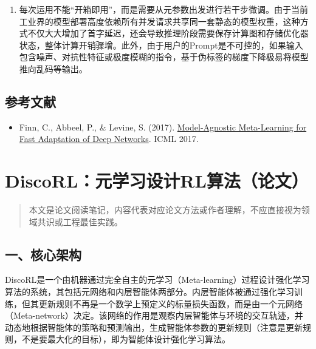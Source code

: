 \begin{enumerate}
\def\labelenumi{\arabic{enumi}.}
\setcounter{enumi}{1}
\tightlist
\item
  每次运用不能``开箱即用''，而是需要从元参数出发进行若干步微调。由于当前工业界的模型部署高度依赖所有并发请求共享同一套静态的模型权重，这种方式不仅大大增加了首字延迟，还会导致推理阶段需要保存计算图和存储优化器状态，整体计算开销骤增。此外，由于用户的Prompt是不可控的，如果输入包含噪声、对抗性特征或极度模糊的指令，基于伪标签的梯度下降极易将模型推向乱码等输出。
\end{enumerate}

\hypertarget{ux53c2ux8003ux6587ux732e-143}{%
\subsection{参考文献}\label{ux53c2ux8003ux6587ux732e-143}}

\begin{itemize}
\tightlist
\item
  Finn, C., Abbeel, P., \& Levine, S. (2017). \href{https://arxiv.org/abs/1703.03400}{Model-Agnostic Meta-Learning for Fast Adaptation of Deep Networks}. ICML 2017.
\end{itemize}

\clearpage

\hypertarget{discorlux5143ux5b66ux4e60ux8bbeux8ba1rlux7b97ux6cd5ux8bbaux6587}{%
\section{DiscoRL：元学习设计RL算法（论文）}\label{discorlux5143ux5b66ux4e60ux8bbeux8ba1rlux7b97ux6cd5ux8bbaux6587}}

\begin{quote}
本文是论文阅读笔记，内容代表对应论文方法或作者理解，不应直接视为领域共识或工程最佳实践。
\end{quote}

\hypertarget{ux4e00ux6838ux5fc3ux67b6ux6784-6}{%
\subsection{一、核心架构}\label{ux4e00ux6838ux5fc3ux67b6ux6784-6}}

DiscoRL是一个由机器通过完全自主的元学习（Meta-learning）过程设计强化学习算法的系统，其包括元网络和内层智能体两部分。内层智能体被通过强化学习训练，但其更新规则不再是一个数学上预定义的标量损失函数，而是由一个元网络（Meta-network）决定。该网络的作用是观察内层智能体与环境的交互轨迹，并动态地根据智能体的策略和预测输出，生成智能体参数的更新规则（注意是更新规则，不是要最大化的目标），即为智能体设计强化学习算法。

